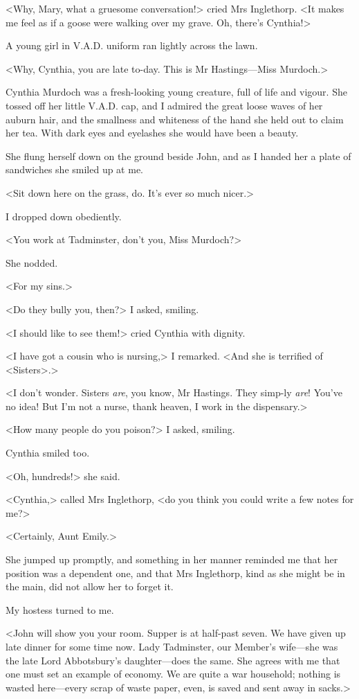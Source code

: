  <Why, Mary, what a gruesome conversation!> cried Mrs Inglethorp. <It makes me feel as if a goose were walking over my grave. Oh, there's Cynthia!> 

 A young girl in V.A.D. uniform ran lightly across the lawn. 

 <Why, Cynthia, you are late to-day. This is Mr Hastings—Miss Murdoch.> 

 Cynthia Murdoch was a fresh-looking young creature, full of life and vigour. She tossed off her little V.A.D. cap, and I admired the great loose waves of her auburn hair, and the smallness and whiteness of the hand she held out to claim her tea. With dark eyes and eyelashes she would have been a beauty. 

 She flung herself down on the ground beside John, and as I handed her a plate of sandwiches she smiled up at me. 

 <Sit down here on the grass, do. It's ever so much nicer.> 

 I dropped down obediently. 

 <You work at Tadminster, don't you, Miss Murdoch?> 

 She nodded. 

 <For my sins.> 

 <Do they bully you, then?> I asked, smiling. 

 <I should like to see them!> cried Cynthia with dignity. 

 <I have got a cousin who is nursing,> I remarked. <And she is terrified of <Sisters>.> 

 <I don't wonder. Sisters \emph{are}, you know, Mr Hastings. They simp-ly \emph{are}! You've no idea! But I'm not a nurse, thank heaven, I work in the dispensary.> 

 <How many people do you poison?> I asked, smiling. 

 Cynthia smiled too. 

 <Oh, hundreds!> she said. 

 <Cynthia,> called Mrs Inglethorp, <do you think you could write a few notes for me?> 

 <Certainly, Aunt Emily.> 

 She jumped up promptly, and something in her manner reminded me that her position was a dependent one, and that Mrs Inglethorp, kind as she might be in the main, did not allow her to forget it. 

 My hostess turned to me. 

 <John will show you your room. Supper is at half-past seven. We have given up late dinner for some time now. Lady Tadminster, our Member's wife—she was the late Lord Abbotsbury's daughter—does the same. She agrees with me that one must set an example of economy. We are quite a war household; nothing is wasted here—every scrap of waste paper, even, is saved and sent away in sacks.> 

